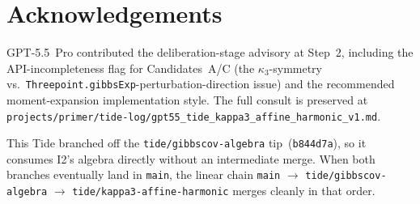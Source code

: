 \documentclass[11pt]{article}
\begin{document}
\section*{Acknowledgements}

GPT-5.5~Pro contributed the deliberation-stage advisory at Step~2,
including the API-incompleteness flag for Candidates~A/C (the
$\kappa_3$-symmetry vs.\ \texttt{Threepoint.gibbsExp}-perturbation-direction
issue) and the recommended moment-expansion implementation style.
The full consult is preserved at
\texttt{projects/primer/tide-log/gpt55\_tide\_kappa3\_affine\_harmonic\_v1.md}.

This Tide branched off the \texttt{tide/gibbscov-algebra}
tip~(\texttt{b844d7a}), so it consumes I2's algebra directly without
an intermediate merge. When both branches eventually land in
\texttt{main}, the linear chain
\texttt{main} $\to$ \texttt{tide/gibbscov-algebra} $\to$
\texttt{tide/kappa3-affine-harmonic} merges cleanly in that order.
\end{document}
